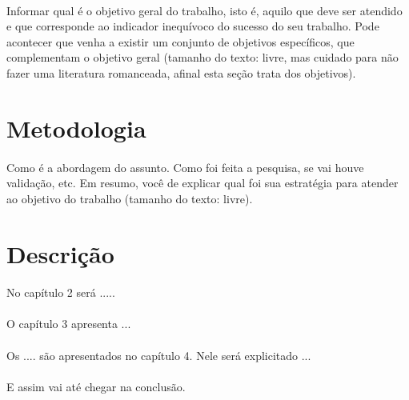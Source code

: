 \paragraph{}Informar qual é o objetivo geral do trabalho, isto é, aquilo que deve ser atendido e que corresponde ao indicador inequívoco do sucesso do seu trabalho. Pode acontecer que venha a existir um conjunto de objetivos específicos, que complementam o objetivo geral (tamanho do texto: livre, mas cuidado para não fazer uma literatura romanceada, afinal esta seção trata dos objetivos).


\section{Metodologia}

\paragraph{}Como é a abordagem do assunto. Como foi feita a pesquisa, se vai houve validação, etc. Em resumo, você de explicar qual foi sua estratégia para atender ao objetivo do trabalho (tamanho do texto: livre).


\section{Descrição}

\paragraph{}No capítulo 2 será .....

\paragraph{}O capítulo 3 apresenta ...

\paragraph{}Os .... são apresentados no capítulo 4. Nele será explicitado ...

\paragraph{}E assim vai até chegar na conclusão.
